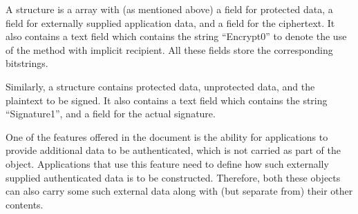 {A \mCoseEncrypt{} structure is a \mCbor{} array with (as mentioned above) a field for protected data, a field for externally supplied application data, and a field for the ciphertext. It also contains a text field which contains the string ``Encrypt0'' to denote the use of the method with implicit recipient. All these fields store the corresponding bitstrings.

Similarly, a \mCoseSign{} structure contains protected data, unprotected data, and the plaintext to be signed. It also contains a text field which contains the string ``Signature1'', and a field for the actual signature.

One of the features offered in the \mCose{} document is the ability for applications to provide additional data to be authenticated, which is not carried as part of the \mCose{} object. Applications that use this feature need to define how such externally supplied authenticated data is to be constructed. Therefore, both these objects can also carry some such external data along with (but separate from) their other contents.


}

